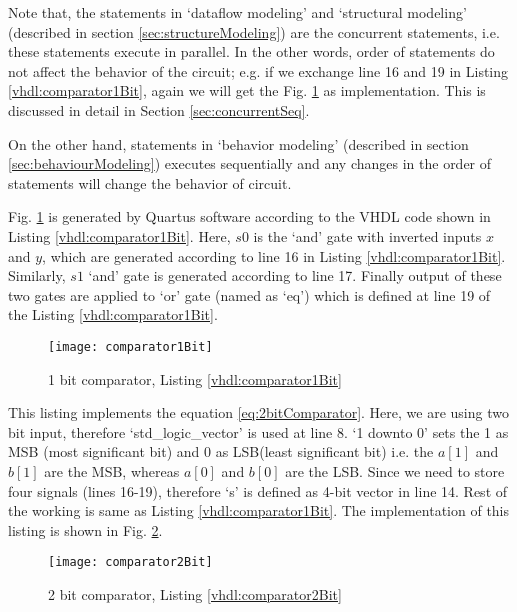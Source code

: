\begin{noNumBox}
	Note that, the statements in `dataflow modeling' and `structural modeling' (described in section \ref{sec:structureModeling}) are the concurrent statements, i.e. these statements execute in parallel. In the other words, order of statements do not affect the behavior of the circuit; e.g. if we exchange line 16 and 19 in Listing \ref{vhdl:comparator1Bit}, again we will get the Fig. \ref{fig:comparator1Bit} as implementation. This is discussed in detail in Section \ref{sec:concurrentSeq}. 
	
	On the other hand, statements in `behavior modeling' (described in section \ref{sec:behaviourModeling}) executes sequentially and any changes in the order of statements will change the behavior of circuit. 
\end{noNumBox}

\begin{explanation}
	Fig. \ref{fig:comparator1Bit} is generated by Quartus software according to the VHDL code shown in Listing \ref{vhdl:comparator1Bit}. Here, $s0$ is the `and' gate with inverted inputs $x$ and $y$, which are generated according to line 16 in Listing \ref{vhdl:comparator1Bit}. Similarly,  $s1$ `and' gate is generated according to line 17. Finally output of these two gates are applied to `or' gate (named as `eq') which is defined at line 19 of the Listing \ref{vhdl:comparator1Bit}.   
\end{explanation}
\begin{figure}[!h]
	\centering
	\texttt{[image: comparator1Bit]}
	\caption{1 bit comparator, Listing \ref{vhdl:comparator1Bit}}
	\label{fig:comparator1Bit}
\end{figure}

\begin{explanation} 
	This listing implements the equation \ref{eq:2bitComparator}. Here, we are using two bit input, therefore `std\_logic\_vector' is used at line 8. `1 downto 0' sets the 1 as MSB (most significant bit) and 0 as LSB(least significant bit) i.e. the $a[1]$ and $b[1]$ are the MSB, whereas $a[0]$ and $b[0]$ are the LSB. Since we need to store four signals (lines 16-19), therefore `s' is defined as 4-bit vector in line 14. Rest of the working is same as Listing \ref{vhdl:comparator1Bit}. The implementation of this listing is shown in Fig. \ref{fig:comparator2Bit}. 
\end{explanation}

\begin{figure}[!h]
	\centering
	\texttt{[image: comparator2Bit]}
	\caption{2 bit comparator, Listing \ref{vhdl:comparator2Bit}}
	\label{fig:comparator2Bit}
\end{figure}

